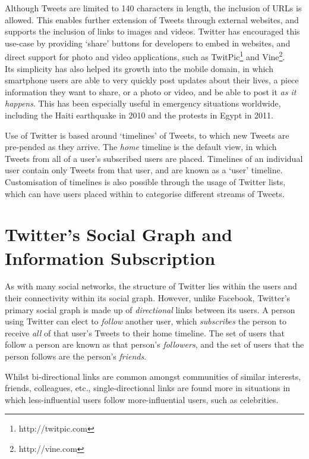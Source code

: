 Although Tweets are limited to 140 characters in length, the inclusion of URLs is allowed. This enables further extension of Tweets through external websites, and supports the inclusion of links to images and videos. Twitter has encouraged this use-case by providing `share' buttons for developers to embed in websites, and direct support for photo and video applications, such as TwitPic\footnote{http://twitpic.com} and Vine\footnote{http://vine.com}.\\
Its simplicity has also helped its growth into the mobile domain, in which smartphone users are able to very quickly post updates about their lives, a piece information they want to share, or a photo or video, and be able to post it \textit{as it happens}. This has been especially useful in emergency situations worldwide, including the Haiti earthquake in 2010 and the protests in Egypt in 2011.

Use of Twitter is based around `timelines' of Tweets, to which new Tweets are pre-pended as they arrive. The \textit{home} timeline is the default view, in which Tweets from all of a user's subscribed users are placed. Timelines of an individual user contain only Tweets from that user, and are known as a `user' timeline. Customisation of timelines is also possible through the usage of Twitter lists, which can have users placed within to categorise different streams of Tweets.


\section{Twitter's Social Graph and Information Subscription}
As with many social networks, the structure of Twitter lies within the users and their connectivity within its social graph. However, unlike Facebook, Twitter's primary social graph is made up of \textit{directional} links between its users. A person using Twitter can elect to \textit{follow} another user, which \textit{subscribes} the person to receive \textit{all} of that user's Tweets to their home timeline. The set of users that follow a person are known as that person's \textit{followers}, and the set of users that the person follows are the person's \textit{friends}.

Whilst bi-directional links are common amongst communities of similar interests, friends, colleagues, etc., single-directional links are found more in situations in which less-influential users follow more-influential users, such as celebrities.


